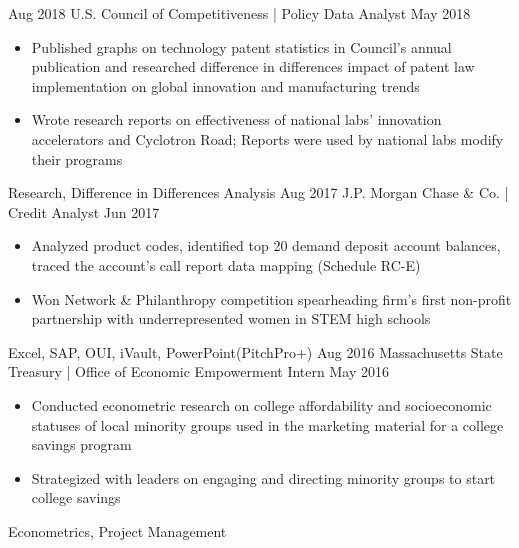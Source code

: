 \begin{experiences}
  \emptySeparator
  \experience
  {Aug 2018}	{U.S. Council of Competitiveness | Policy Data Analyst}
  {May 2018}	{
  					\begin{itemize}
  						\item Published graphs on technology patent statistics in Council's annual publication and researched difference in differences impact of patent law implementation on global innovation and manufacturing trends 
  						\item Wrote research reports on effectiveness of national labs' innovation accelerators and Cyclotron Road; Reports were used by national labs modify their programs
  					\end{itemize}
  				}
 				{Research, Difference in Differences Analysis}
 \emptySeparator
  \experience
    {Aug 2017} {J.P. Morgan Chase \& Co. | Credit Analyst}
    {Jun 2017}    {
                      \begin{itemize}
                      	\item Analyzed product codes, identified top 20 demand deposit account balances, traced the account's call report data mapping (Schedule RC-E)    
                        \item Won Network \& Philanthropy competition spearheading firm's first non-profit partnership with underrepresented women in STEM high schools                                   
                      \end{itemize}
                    }
                    {Excel, SAP, OUI, iVault, PowerPoint(PitchPro+)}
  \emptySeparator
  \experience
    {Aug 2016}     {Massachusetts State Treasury | Office of Economic Empowerment Intern}
    {May 2016}    {
                      \begin{itemize}
                      	\item Conducted econometric research on college affordability and socioeconomic statuses of local minority groups used in the marketing material for a college savings program
                      	\item Strategized with leaders on engaging and directing minority groups to start college savings  
                      \end{itemize}
                    }{Econometrics, Project Management}
\end{experiences}
